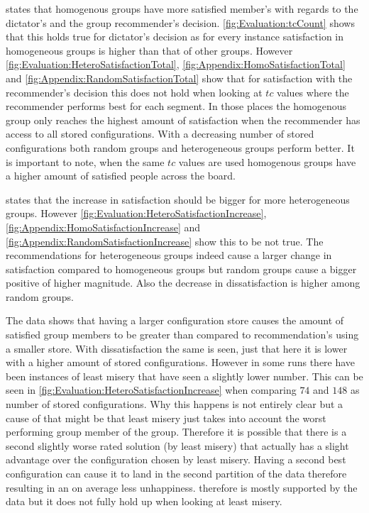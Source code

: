  states that homogenous groups have more satisfied member's with regards to the dictator's and the group recommender's decision. \autoref{fig:Evaluation:tcCount} shows that this holds true for dictator's decision as for every instance satisfaction in homogeneous groups is higher than that of other groups. However \autoref{fig:Evaluation:HeteroSatisfactionTotal}, \autoref{fig:Appendix:HomoSatisfactionTotal} and \autoref{fig:Appendix:RandomSatisfactionTotal} show that for satisfaction with the recommender's decision this does not hold when looking at $tc$ values where the recommender performs best for each  segment. In those places the homogenous group only reaches the highest amount of satisfaction when the recommender has access to all stored configurations. With a decreasing number of stored configurations both random groups and heterogeneous groups perform better. It is important to note, when the same $tc$ values are used homogenous groups have a higher amount of satisfied people across the board.

 states that the increase in satisfaction should be bigger for more heterogeneous groups. However \autoref{fig:Evaluation:HeteroSatisfactionIncrease}, \autoref{fig:Appendix:HomoSatisfactionIncrease} and \autoref{fig:Appendix:RandomSatisfactionIncrease} show this to be not true. The recommendations for heterogeneous groups indeed cause a larger change in satisfaction compared to homogeneous groups but random groups cause a bigger positive of higher magnitude. Also the decrease in dissatisfaction is higher among random groups.

The data shows that having a larger configuration store causes the amount of satisfied group members to be greater than compared to recommendation's using a smaller store. With dissatisfaction the same is seen, just that here it is lower with a higher amount of stored configurations. However in some runs there have been instances of least misery that have seen a slightly lower number. This can be seen in \autoref{fig:Evaluation:HeteroSatisfactionIncrease} when comparing $74$ and $148$ as number of stored configurations. Why this happens is not entirely clear but a cause of that might be that least misery just takes into account the worst performing group member of the group. Therefore it is possible that there is a second slightly worse rated solution (by least misery) that actually has a slight advantage over the configuration chosen by least misery. Having a second best configuration can cause it to land in the second partition of the data therefore resulting in an on average less unhappiness.  therefore is mostly supported by the data but it does not fully hold up when looking at least misery.

